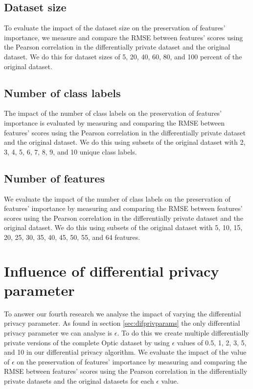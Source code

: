 \subsection{Dataset size}
To evaluate the impact of the dataset size on the preservation of features' importance, we measure and compare the RMSE between features' scores using the Pearson correlation in the differentially private dataset and the original dataset. We do this for dataset sizes of 5, 20, 40, 60, 80, and 100 percent of the original dataset. %

\subsection{Number of class labels}
The impact of the number of class labels on the preservation of features' importance is evaluated by measuring and comparing the RMSE between features' scores using the Pearson correlation in the differentially private dataset and the original dataset. We do this using subsets of the original dataset with 2, 3, 4, 5, 6, 7, 8, 9, and 10 unique class labels.

\subsection{Number of features}
We evaluate the impact of the number of class labels on the preservation of features' importance by measuring and comparing the RMSE between features' scores using the Pearson correlation in the differentially private dataset and the original dataset. We do this using subsets of the original dataset with 5, 10, 15, 20, 25, 30, 35, 40, 45, 50, 55, and 64 features.

\section{Influence of differential privacy parameter}
To answer our fourth research we analyse the impact of varying the differential privacy parameter. As found in section \ref{sec:difprivparams} the only differential privacy parameter we can analyse is $\epsilon$. To do this we create multiple differentially private versions of the complete Optic dataset by using $\epsilon$ values of 0.5, 1, 2, 3, 5, and 10 in our differential privacy algorithm. We evaluate the impact of the value of $\epsilon$ on the preservation of features' importance by measuring and comparing the RMSE between features' scores using the Pearson correlation in the differentially private datasets and the original datasets for each $\epsilon$ value.


